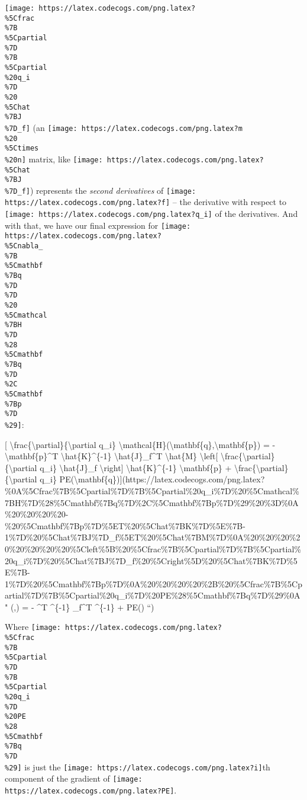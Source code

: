 \documentclass[]{article}
\begin{document}
\texttt{[image: https://latex.codecogs.com/png.latex?\\\%5Cfrac\\\%7B\\\%5Cpartial\\\%7D\\\%7B\\\%5Cpartial\\\%20q\_i\\\%7D\\\%20\\\%5Chat\\\%7BJ\\\%7D\_f]}
(an \texttt{[image: https://latex.codecogs.com/png.latex?m\\\%20\\\%5Ctimes\\\%20n]}
matrix, like
\texttt{[image: https://latex.codecogs.com/png.latex?\\\%5Chat\\\%7BJ\\\%7D\_f]})
represents the \emph{second derivatives} of
\texttt{[image: https://latex.codecogs.com/png.latex?f]} -- the derivative with
respect to \texttt{[image: https://latex.codecogs.com/png.latex?q\_i]} of the
derivatives. And with that, we have our final expression for
\texttt{[image: https://latex.codecogs.com/png.latex?\\\%5Cnabla\_\\\%7B\\\%5Cmathbf\\\%7Bq\\\%7D\\\%7D\\\%20\\\%5Cmathcal\\\%7BH\\\%7D\\\%28\\\%5Cmathbf\\\%7Bq\\\%7D\\\%2C\\\%5Cmathbf\\\%7Bp\\\%7D\\\%29]}:

{[} \textbackslash{}frac\{\textbackslash{}partial\}\{\textbackslash{}partial
q\_i\}
\textbackslash{}mathcal\{H\}(\textbackslash{}mathbf\{q\},\textbackslash{}mathbf\{p\})
= - \textbackslash{}mathbf\{p\}\^{}T \textbackslash{}hat\{K\}\^{}\{-1\}
\textbackslash{}hat\{J\}\_f\^{}T \textbackslash{}hat\{M\}
\textbackslash{}left{[}
\textbackslash{}frac\{\textbackslash{}partial\}\{\textbackslash{}partial q\_i\}
\textbackslash{}hat\{J\}\_f \textbackslash{}right{]}
\textbackslash{}hat\{K\}\^{}\{-1\} \textbackslash{}mathbf\{p\} +
\textbackslash{}frac\{\textbackslash{}partial\}\{\textbackslash{}partial q\_i\}
PE(\textbackslash{}mathbf\{q\}){]}(https://latex.codecogs.com/png.latex?\%0A\%5Cfrac\%7B\%5Cpartial\%7D\%7B\%5Cpartial\%20q\_i\%7D\%20\%5Cmathcal\%7BH\%7D\%28\%5Cmathbf\%7Bq\%7D\%2C\%5Cmathbf\%7Bp\%7D\%29\%20\%3D\%0A\%20\%20\%20\%20-\%20\%5Cmathbf\%7Bp\%7D\%5ET\%20\%5Chat\%7BK\%7D\%5E\%7B-1\%7D\%20\%5Chat\%7BJ\%7D\_f\%5ET\%20\%5Chat\%7BM\%7D\%0A\%20\%20\%20\%20\%20\%20\%20\%20\%5Cleft\%5B\%20\%5Cfrac\%7B\%5Cpartial\%7D\%7B\%5Cpartial\%20q\_i\%7D\%20\%5Chat\%7BJ\%7D\_f\%20\%5Cright\%5D\%20\%5Chat\%7BK\%7D\%5E\%7B-1\%7D\%20\%5Cmathbf\%7Bp\%7D\%0A\%20\%20\%20\%20\%2B\%20\%5Cfrac\%7B\%5Cpartial\%7D\%7B\%5Cpartial\%20q\_i\%7D\%20PE\%28\%5Cmathbf\%7Bq\%7D\%29\%0A
"  (,) = -
\^{}T \^{}\{-1\} \_f\^{}T 
 \^{}\{-1\}
 +  PE() ``)

Where
\texttt{[image: https://latex.codecogs.com/png.latex?\\\%5Cfrac\\\%7B\\\%5Cpartial\\\%7D\\\%7B\\\%5Cpartial\\\%20q\_i\\\%7D\\\%20PE\\\%28\\\%5Cmathbf\\\%7Bq\\\%7D\\\%29]}
is just the \texttt{[image: https://latex.codecogs.com/png.latex?i]}th component
of the gradient of \texttt{[image: https://latex.codecogs.com/png.latex?PE]}.
\end{document}
